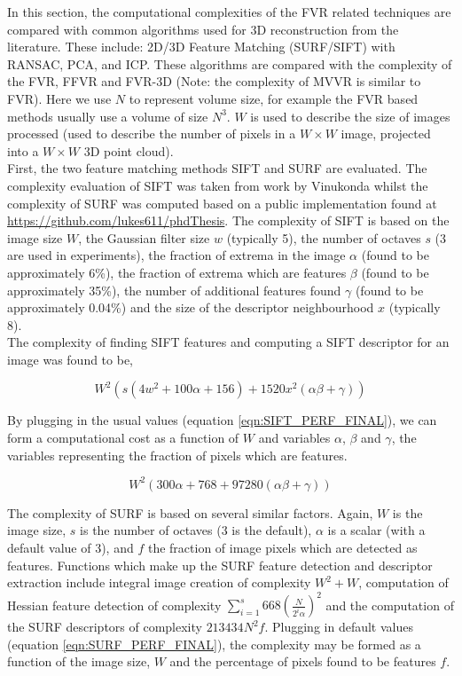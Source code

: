 In this section, the computational complexities of the FVR related techniques are compared with common algorithms used for 3D reconstruction from the literature. These include: 2D/3D Feature Matching (SURF/SIFT) with RANSAC, PCA, and ICP. These algorithms are compared with the complexity of the FVR, FFVR and FVR-3D (Note: the complexity of MVVR is similar to FVR). Here we use $N$ to represent volume size, for example the FVR based methods usually use a volume of size $N^3$. $W$ is used to describe the size of images processed (used to describe the number of pixels in a $W\times W$ image, projected into a $W\times W$ 3D point cloud). \\


First, the two feature matching methods SIFT and SURF are evaluated. The complexity evaluation of SIFT was taken from work by Vinukonda \cite{Vinukonda11Study} whilst the complexity of SURF was computed based on a public implementation found at \url{https://github.com/lukes611/phdThesis}. The complexity of SIFT is based on the image size $W$, the Gaussian filter size $w$ (typically 5), the number of octaves $s$ (3 are used in experiments), the fraction of extrema in the image $\alpha$ (found to be approximately 6\%), the fraction of extrema which are features $\beta$ (found to be approximately 35\%), the number of additional features found $\gamma$ (found to be approximately 0.04\%) and the size of the descriptor neighbourhood $x$ (typically 8). \\


The complexity of finding SIFT features and computing a SIFT descriptor for an image was found to be,

\begin{equation} \label{eqn:SIFT_PERF}
W^2(s(4w^2 + 100\alpha + 156) + 1520x^2(\alpha \beta + \gamma))
\end{equation}

By plugging in the usual values (equation \ref{eqn:SIFT_PERF_FINAL}), we can form a computational cost as a function of $W$ and variables $\alpha$, $\beta$ and $\gamma$, the variables representing the fraction of pixels which are features.

\begin{equation} \label{eqn:SIFT_PERF_FINAL}
W^2(300\alpha + 768 + 97280(\alpha \beta + \gamma))
\end{equation}

The complexity of SURF is based on several similar factors. Again, $W$ is the image size, $s$ is the number of octaves (3 is the default), $\alpha$ is a scalar (with a default value of 3), and $f$ the fraction of image pixels which are detected as features. Functions which make up the SURF feature detection and descriptor extraction include integral image creation of complexity $W^2 + W$, computation of Hessian feature detection of complexity $\sum_{i=1}^{s} 668(\frac{N}{2^i\alpha})^2$ and the computation of the SURF descriptors of complexity $213434N^2f$. Plugging in default values (equation \ref{eqn:SURF_PERF_FINAL}), the complexity may be formed as a function of the image size, $W$ and the percentage of pixels found to be features $f$.

